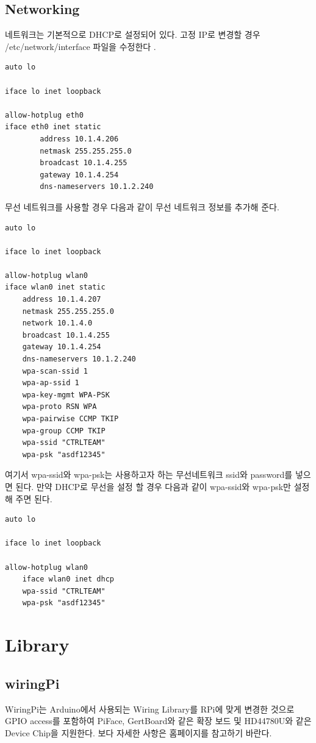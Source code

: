 \documentclass[11pt
  , a4paper
  , article
  , oneside
]{memoir}
\begin{document}
\subsection{Networking}
네트워크는 기본적으로 DHCP로 설정되어 있다. 고정 IP로 변경할 경우 /etc/network/interface 파일을 수정한다
.
\begin{lstlisting}[style=termstyle]
auto lo

iface lo inet loopback

allow-hotplug eth0
iface eth0 inet static
        address 10.1.4.206
        netmask 255.255.255.0
        broadcast 10.1.4.255
        gateway 10.1.4.254
        dns-nameservers 10.1.2.240
\end{lstlisting}
무선 네트워크를 사용할 경우 다음과 같이 무선 네트워크 정보를 추가해 준다.
\begin{lstlisting}[style=termstyle]
auto lo

iface lo inet loopback

allow-hotplug wlan0
iface wlan0 inet static
	address 10.1.4.207
	netmask 255.255.255.0
	network 10.1.4.0
	broadcast 10.1.4.255
	gateway 10.1.4.254
	dns-nameservers 10.1.2.240
	wpa-scan-ssid 1
	wpa-ap-ssid 1
	wpa-key-mgmt WPA-PSK
	wpa-proto RSN WPA
	wpa-pairwise CCMP TKIP
	wpa-group CCMP TKIP
	wpa-ssid "CTRLTEAM"
	wpa-psk "asdf12345"
\end{lstlisting}
여기서 wpa-ssid와 wpa-psk는 사용하고자 하는 무선네트워크 ssid와 password를 넣으면 된다. 
만약 DHCP로 무선을 설정 할 경우 다음과 같이 wpa-ssid와 wpa-psk만 설정해 주면 된다.
\begin{lstlisting}[style=termstyle]
auto lo

iface lo inet loopback

allow-hotplug wlan0
	iface wlan0 inet dhcp
	wpa-ssid "CTRLTEAM"
	wpa-psk "asdf12345"
\end{lstlisting}
\section{Library}
\subsection{wiringPi}
WiringPi는 Arduino에서 사용되는 Wiring Library를 RPi에 맞게 변경한 것으로 GPIO access를 포함하여 
PiFace, GertBoard와 같은 확장 보드 및 HD44780U와 같은 Device Chip을 지원한다. 보다 자세한 사항은
홈페이지를 참고하기 바란다.\\
\end{document}
